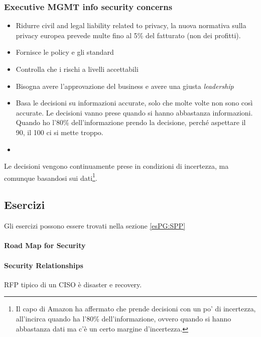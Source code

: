 \subsubsection{Executive MGMT info security concerns}

\begin{itemize}
\item Ridurre civil and legal liability related to privacy, la nuova normativa 
sulla privacy europea prevede multe fino al 5\% del fatturato (non dei 
profitti).
\item Fornisce le policy e gli standard
\item Controlla che i rischi a livelli accettabili
\item Bisogna avere l'approvazione del business e avere una giusta 
\textit{leadership}
\item Basa le decisioni su informazioni accurate, solo che molte volte non sono 
così accurate. Le decisioni vanno prese quando si hanno abbastanza informazioni. 
Quando ho l'80\% dell'informazione prendo la decisione, perché aspettare il 90, 
il 100 ci si mette troppo.
\item {}
\end{itemize}


Le decisioni vengono continuamente prese in condizioni di incertezza, ma 
comunque basandosi sui dati\footnote{Il capo di Amazon ha affermato che prende 
decisioni con un po' di incertezza, all'incirca quando ha l'80\% 
dell'informazione, ovvero quando si hanno abbastanza dati ma c'è un certo 
margine d'incertezza.}.


\subsection{Esercizi}

Gli esercizi possono essere trovati nella sezione \ref{esPG:SPP}

\paragraph{Road Map for Security}

\paragraph{Security Relationships}


RFP tipico di un CISO è disaster e recovery. 


